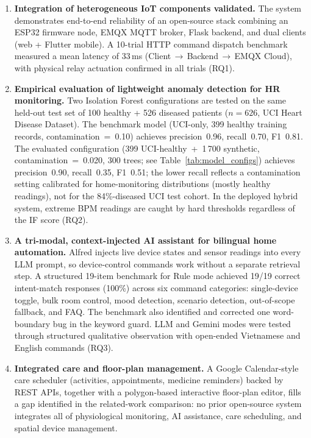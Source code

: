 \begin{enumerate}

\item \textbf{Integration of heterogeneous IoT components validated.}
The system demonstrates end-to-end reliability of an open-source stack combining an ESP32 firmware node, EMQX MQTT broker, Flask backend, and dual clients (web + Flutter mobile). A 10-trial HTTP command dispatch benchmark measured a mean latency of 33\,ms (Client\,$\to$\,Backend\,$\to$\,EMQX Cloud), with physical relay actuation confirmed in all trials (RQ1).

\item \textbf{Empirical evaluation of lightweight anomaly detection for HR monitoring.}
Two Isolation Forest configurations are tested on the same held-out test set of 100 healthy + 526 diseased patients ($n=626$, UCI Heart Disease Dataset). The benchmark model (UCI-only, 399 healthy training records, contamination~=~0.10) achieves precision~0.96, recall~0.70, F1~0.81. The evaluated configuration (399 UCI-healthy~+~1\,700 synthetic, contamination~=~0.020, 300 trees; see Table~\ref{tab:model_configs}) achieves precision~0.90, recall~0.35, F1~0.51; the lower recall reflects a contamination setting calibrated for home-monitoring distributions (mostly healthy readings), not for the 84\%-diseased UCI test cohort. In the deployed hybrid system, extreme BPM readings are caught by hard thresholds regardless of the IF score (RQ2).

\item \textbf{A tri-modal, context-injected AI assistant for bilingual home automation.}
Alfred injects live device states and sensor readings into every LLM prompt, so device-control commands work without a separate retrieval step. A structured 19-item benchmark for Rule mode achieved 19/19 correct intent-match responses (100\%) across six command categories: single-device toggle, bulk room control, mood detection, scenario detection, out-of-scope fallback, and FAQ. The benchmark also identified and corrected one word-boundary bug in the keyword guard. LLM and Gemini modes were tested through structured qualitative observation with open-ended Vietnamese and English commands (RQ3).

\item \textbf{Integrated care and floor-plan management.}
A Google Calendar-style care scheduler (activities, appointments, medicine reminders) backed by REST APIs, together with a polygon-based interactive floor-plan editor, fills a gap identified in the related-work comparison: no prior open-source system integrates all of physiological monitoring, AI assistance, care scheduling, and spatial device management.

\end{enumerate}

